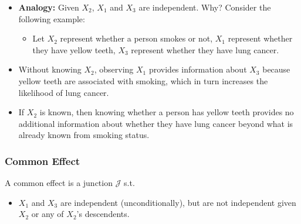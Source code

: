 \begin{notes}
    \begin{itemize}
        \item \textbf{Analogy:} Given $X_2$, $X_1$ and $X_3$ are independent. Why? Consider the following example:
        \begin{itemize}
            \item Let $X_2$ represent whether a person smokes or not, $X_1$ represent whether they have yellow teeth, $X_3$ represent whether they have lung cancer.
        \end{itemize}
        \item Without knowing $X_2$, observing $X_1$ provides information about $X_3$ because yellow teeth are associated with smoking, which in turn increases the likelihood of lung cancer. 
        \item If $X_2$ is known, then knowing whether a person has yellow teeth provides no additional information about whether they have lung cancer beyond what is already known from smoking status. 
    \end{itemize}
\end{notes}


\subsubsection{Common Effect}
\begin{definition}
    A common effect is a junction $\mathcal{J}$ s.t.
    \begin{itemize}
        \item $X_1$ and $X_3$ are independent (unconditionally), but are not independent given $X_2$ or any of $X_2$'s descendents.
    \end{itemize}
\end{definition}

